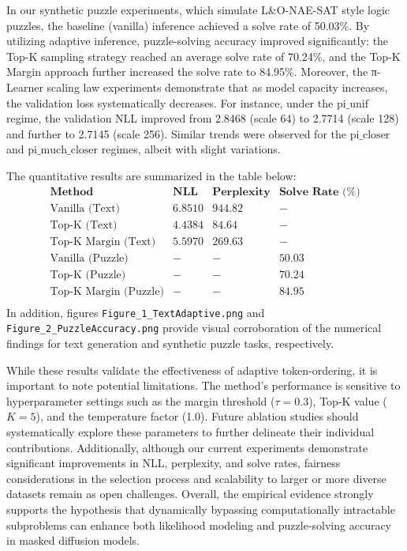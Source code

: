 \documentclass{article}
\begin{document}
In our synthetic puzzle experiments, which simulate L\&O-NAE-SAT style logic puzzles, the baseline (vanilla) inference achieved a solve rate of 50.03\%. By utilizing adaptive inference, puzzle-solving accuracy improved significantly: the Top-K sampling strategy reached an average solve rate of 70.24\%, and the Top-K Margin approach further increased the solve rate to 84.95\%. Moreover, the π-Learner scaling law experiments demonstrate that as model capacity increases, the validation loss systematically decreases. For instance, under the \(\text{pi\_unif}\) regime, the validation NLL improved from 2.8468 (scale 64) to 2.7714 (scale 128) and further to 2.7145 (scale 256). Similar trends were observed for the \(\text{pi\_closer}\) and \(\text{pi\_much\_closer}\) regimes, albeit with slight variations.

The quantitative results are summarized in the table below:
\[
\begin{array}{l|ccc}
\textbf{Method} & \textbf{NLL} & \textbf{Perplexity} & \textbf{Solve Rate (\%)} \\
\hline
\text{Vanilla (Text)} & 6.8510 & 944.82 & - \\
\text{Top-K (Text)} & 4.4384 & 84.64 & - \\
\text{Top-K Margin (Text)} & 5.5970 & 269.63 & - \\
\text{Vanilla (Puzzle)} & - & - & 50.03 \\
\text{Top-K (Puzzle)} & - & - & 70.24 \\
\text{Top-K Margin (Puzzle)} & - & - & 84.95 \\
\end{array}
\]
In addition, figures \texttt{Figure\_1\_TextAdaptive.png} and \texttt{Figure\_2\_PuzzleAccuracy.png} provide visual corroboration of the numerical findings for text generation and synthetic puzzle tasks, respectively.

While these results validate the effectiveness of adaptive token-ordering, it is important to note potential limitations. The method’s performance is sensitive to hyperparameter settings such as the margin threshold (\(\tau = 0.3\)), Top-K value (\(K = 5\)), and the temperature factor (1.0). Future ablation studies should systematically explore these parameters to further delineate their individual contributions. Additionally, although our current experiments demonstrate significant improvements in NLL, perplexity, and solve rates, fairness considerations in the selection process and scalability to larger or more diverse datasets remain as open challenges. Overall, the empirical evidence strongly supports the hypothesis that dynamically bypassing computationally intractable subproblems can enhance both likelihood modeling and puzzle-solving accuracy in masked diffusion models.
\end{document}
